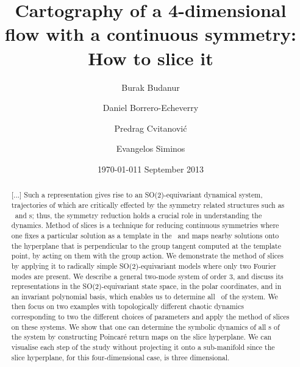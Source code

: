 \documentclass[aip,cha,
reprint,
secnumarabic,
nofootinbib, tightenlines,
nobibnotes, showkeys, showpacs,
groupedaddress,
]{revtex4-1}
\begin{document}
\title[Low-dimensional cartography]
{Cartography of a 4-dimensional flow with a continuous symmetry:
How to slice it}

\author{Burak Budanur}
\author{Daniel Borrero-Echeverry}
\author{Predrag Cvitanovi\'{c}}
\author{Evangelos Siminos}
    \ifdraft
\date{\today}
    \else
\date{1 September 2013}
   \fi


    \begin{abstract}
[...]
Such a representation gives rise to an SO(2)-equivariant dynamical system,
trajectories of which are critically effected by the symmetry related structures
such as \reqva\ and \rpo s; thus, the symmetry reduction holds a crucial role
in understanding the dynamics. Method of slices is a technique for reducing
continuous symmetries where one fixes a particular solution as a template in
the \statesp\ and maps nearby solutions onto the hyperplane that is perpendicular
to the group tangent computed at the template point, by acting on them with
the group action. We demonstrate the method of slices by applying it to
radically simple SO(2)-equivariant models where only two Fourier modes are present.
We describe a general two-mode system of order 3, and discuss its representations
in the SO(2)-equivariant state space, in the polar coordinates, and
in an invariant polynomial basis, which enables us to determine all \reqva\
of the system. We then focus on two examples with topologically
different chaotic dynamics corresponding to two the different choices of
parameters and apply the method of slices on these systems. We show
that one can determine the symbolic dynamics of
all \rpo s of the system by constructing Poincar\'e
return maps on the slice hyperplane. We can visualise each step of the study
without projecting it onto a sub-manifold since the slice hyperplane, for
this four-dimensional case, is three dimensional.
    \end{abstract}
\end{document}
